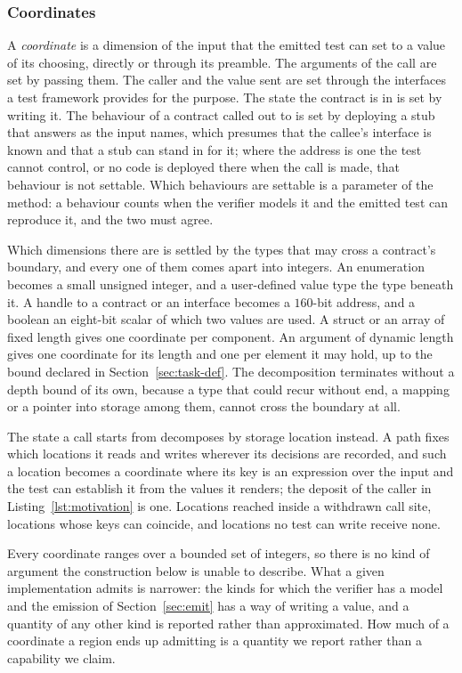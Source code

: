 \documentclass[manuscript,anonymous]{acmart}
\begin{document}
\subsubsection{Coordinates}\label{sec:coords}
A \emph{coordinate} is a dimension of the input that the emitted test can set
to a value of its choosing, directly or through its preamble. The arguments of
the call are set by passing them. The caller and the value sent are set through
the interfaces a test framework provides for the purpose. The state the
contract is in is set by writing it. The behaviour of a contract called out to
is set by deploying a stub that answers as the input names, which presumes that
the callee's interface is known and that a stub can stand in for it; where the
address is one the test cannot control, or no code is deployed there when the
call is made, that behaviour is not settable. Which behaviours are settable is a
parameter of the method: a behaviour counts when the verifier models it and the
emitted test can reproduce it, and the two must agree.

Which dimensions there are is settled by the types that may cross a contract's
boundary, and every one of them comes apart into integers. An enumeration
becomes a small unsigned integer, and a user-defined value type the type beneath
it. A handle to a contract or an interface becomes a $160$-bit address, and a
boolean an eight-bit scalar of which two values are used. A struct or an array
of fixed length gives one coordinate per component. An argument of dynamic
length gives one coordinate for its length and one per element it may hold, up
to the bound declared in Section~\ref{sec:task-def}. The decomposition terminates without a
depth bound of its own, because a type that could recur without end, a mapping
or a pointer into storage among them, cannot cross the boundary at all.

The state a call starts from decomposes by storage location instead. A path
fixes which locations it reads and writes wherever its decisions are recorded,
and such a location becomes a coordinate where its key is an expression over the
input and the test can establish it from the values it renders; the deposit of
the caller in Listing~\ref{lst:motivation} is one. Locations reached inside a
withdrawn call site, locations whose keys can coincide, and locations no test
can write receive none.

Every coordinate ranges over a bounded set of integers, so there is no kind of
argument the construction below is unable to describe. What a given
implementation admits is narrower: the kinds for which the verifier has a model
and the emission of Section~\ref{sec:emit} has a way of writing a value, and a
quantity of any other kind is reported rather than approximated. How much of a
coordinate a region ends up admitting is a quantity we report rather than a
capability we claim.
\end{document}

